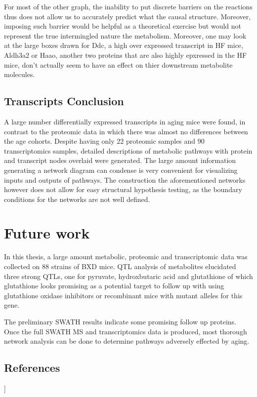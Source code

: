 \documentclass[a4paper,11pt,twoside]{book}
\begin{document}
	 For most of the other graph, the inability to put discrete barriers on the reactions thus does not allow us to accurately predict what the causal structure. Moreover, imposing such barrier would be helpful as a theoretical exercise but would not represent the true intermingled nature the metabolism. Moreover, one may look at the large boxes drawn for Ddc, a high over expressed transcript in HF mice, Aldh3a2 or Haao, another two proteins that are also highly epxressed in the HF mice, don't actually seem to have an effect on thier downstream metabolite molecules. 
	
	
	\section{Transcripts Conclusion}
	
	A large number differentially expressed transcripts in aging mice were found, in contrast to the proteomic data in which there was almost no differences between the age cohorts. Despite having only 22 proteomic samples and 90 transcriptomics samples, detailed descriptions of metabolic pathways with protein and transcript nodes overlaid were generated. The large amount information generating a network diagram can condense is very convenient for visualizing inputs and outputs of pathways. The construction the aforementioned networks however does not allow for easy structural hypothesis testing, as the boundary conditions for the networks are not well defined.
	
	\chapter{Future work}
	
	In this thesis, a large amount metabolic, proteomic and transcriptomic data was collected on 88 strains of BXD mice. QTL analysis of metabolites elucidated three strong QTLs, one for pyruvate, hydroxbutaric acid and glutathione of which glutathione looks promising as a potential target to follow up with using glutathione oxidase inhibitors or recombinant mice with mutant alleles for this gene. 
	
	The preliminary SWATH results indicate some promising follow up proteins. Once the full SWATH MS and transcriptomics data is produced, most thorough network analysis can be done to determine pathways adversely effected by aging. 

\clearpage
\section{References}]
	{}
	
	
\end{document}
